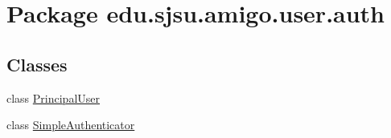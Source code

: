 \hypertarget{namespaceedu_1_1sjsu_1_1amigo_1_1user_1_1auth}{}\section{Package edu.\+sjsu.\+amigo.\+user.\+auth}
\label{namespaceedu_1_1sjsu_1_1amigo_1_1user_1_1auth}
\subsection*{Classes}
\begin{DoxyCompactItemize}
\item 
class \hyperlink{classedu_1_1sjsu_1_1amigo_1_1user_1_1auth_1_1_principal_user}{Principal\+User}
\item 
class \hyperlink{classedu_1_1sjsu_1_1amigo_1_1user_1_1auth_1_1_simple_authenticator}{Simple\+Authenticator}
\end{DoxyCompactItemize}
